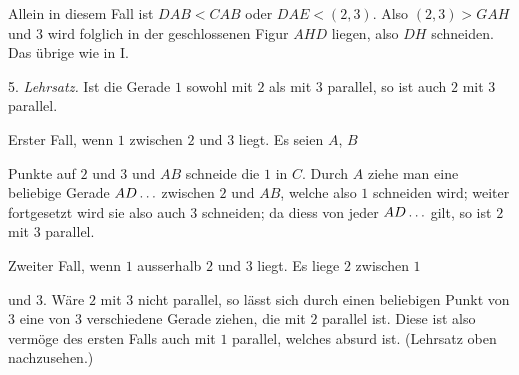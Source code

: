 Allein in diesem Fall ist $DAB < CAB$ oder $DAE < (2,3)$. Also $(2,3) > GAH$ und $3$ wird folglich in der geschlossenen Figur $AHD$ liegen, also $DH$ schneiden. Das übrige wie in I.

5. \emph{Lehrsatz.} Ist die Gerade $1$ sowohl mit $2$ als mit $3$ parallel, so ist auch $2$ mit $3$ parallel.

 Erster Fall, wenn $1$ zwischen $2$ und $3$ liegt. Es seien $A$, $B$

\begin{center}

\end{center}
\noindent Punkte auf $2$ und $3$ und $AB$ schneide die $1$ in $C$. Durch $A$ ziehe man eine beliebige Gerade $AD\mathinner{.\,.\,.}$ zwischen $2$ und $AB$, welche also $1$ schneiden wird; weiter fortgesetzt wird sie also auch $3$ schneiden; da diess von jeder $AD\mathinner{.\,.\,.}$ gilt, so ist $2$ mit $3$ parallel. 

Zweiter Fall, wenn $1$ ausserhalb $2$ und $3$ liegt. Es liege $2$ zwischen $1$

\begin{center}

\end{center}
\noindent und $3$. Wäre $2$ mit $3$ nicht parallel, so lässt sich durch einen beliebigen Punkt von $3$ eine von $3$ verschiedene Gerade ziehen, die mit $2$ parallel ist. Diese ist also vermöge des ersten Falls auch mit $1$ parallel, welches absurd ist. (Lehrsatz oben nachzusehen.)

